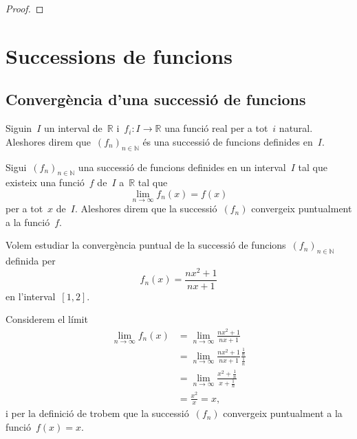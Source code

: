 \documentclass[../../Main.tex]{subfiles}
\begin{document}
\begin{theorem}
\begin{proof}
\begin{comment}
			Aleshores amb \eqref{thm:Teorema de Cauchy:eq1} i \eqref{thm:Teorema de Cauchy:eq2} tenim que
			\[
			    \abs{\sum_{n=1}^{m}a_{\sigma(n)}b_{\tau(n)}-\sum_{n=0}^{\infty}a_{n}\sum_{n=0}^{\infty}b_{n}}+\abs{\sum_{n=0}^{N}a_{n}\sum_{n=0}^{N}b_{n}-\sum_{n=0}^{\infty}a_{n}\sum_{n=0}^{\infty}b_{n}}\leq\varepsilon,
			\]
			i per la desigualtat triangular %
			\[
			    \abs{\sum_{n=1}^{m}a_{\sigma(n)}b_{\tau(n)}-\sum_{n=0}^{N}a_{n}\sum_{n=0}^{N}b_{n}}+\abs{\sum_{n=0}^{N}a_{n}\sum_{n=0}^{N}b_{n}-\sum_{n=0}^{\infty}a_{n}\sum_{n=0}^{\infty}b_{n}}\leq\varepsilon,
			\]
		\end{comment}
		\end{proof}
	\end{theorem}
\section{Successions de funcions}
	\subsection{Convergència d'una successió de funcions}
	\begin{definition}
		\label{def:successió de funcions}
		Siguin~\(I\) un interval de~\(\mathbb{R}\) i~\(f_{i}\colon I\longrightarrow\mathbb{R}\) una funció real per a tot~\(i\) natural.
		Aleshores direm que~\((f_{n})_{n\in\mathbb{N}}\) és una successió de funcions definides en~\(I\).
	\end{definition}
	\begin{definition}
		\label{def:convergència puntual}
		Sigui~\((f_{n})_{n\in\mathbb{N}}\) una successió de funcions definides en un interval~\(I\) tal que existeix una funció~\(f\) de~\(I\) a~\(\mathbb{R}\) tal que
		\[
		    \lim_{n\to\infty}f_{n}(x)=f(x)
		\]
		per a tot~\(x\) de~\(I\).
		Aleshores direm que la successió~\((f_{n})\) convergeix puntualment a la funció~\(f\).
	\end{definition}
	\begin{example}
		\label{ex:convergència puntual d'una successió de funcions}
		Volem estudiar la convergència puntual de la successió de funcions~\((f_{n})_{n\in\mathbb{N}}\) definida per
		\[
		    f_{n}(x)=\frac{nx^{2}+1}{nx+1}
		\]
		en l'interval~\([1,2]\).
		\begin{solution}
			Considerem el límit
			\begin{align*}
				\lim_{n\to\infty}f_{n}(x)&=\lim_{n\to\infty}\frac{nx^{2}+1}{nx+1} \\
				&=\lim_{n\to\infty}\frac{nx^{2}+1}{nx+1}\frac{\frac{1}{n}}{\frac{1}{n}} \\
				&=\lim_{n\to\infty}\frac{x^{2}+\frac{1}{n}}{x+\frac{1}{n}} \\
				&=\frac{x^{2}}{x}=x,
			\end{align*}
			i per la definició de  trobem que la successió~\((f_{n})\) convergeix puntualment a la funció~\(f(x)=x\).
		\end{solution}
	\end{example}
\end{document}
